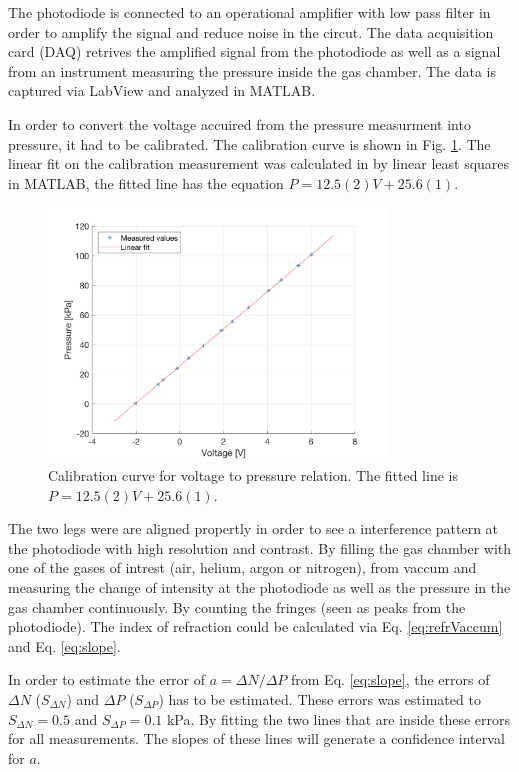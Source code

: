 The photodiode is connected to an operational amplifier with low pass filter in order to amplify the signal and reduce noise in the circut. The data acquisition card (DAQ) retrives the amplified signal from the photodiode as well as a signal from an instrument measuring the pressure inside the gas chamber. The data is captured via LabView and analyzed in MATLAB.

In order to convert the voltage accuired from the pressure measurment into pressure, it had to be calibrated. The calibration curve is shown in Fig. \ref{fig:calibration}. The linear fit on the calibration measurement was calculated in by linear least squares in MATLAB, the fitted line has the equation $P = 12.5(2)V+25.6(1)$. 


\begin{figure}[H]
  \centering
  \includegraphics[width=0.8\textwidth]{matlab/calibration.png}
  \caption{Calibration curve for voltage to pressure relation. The fitted line is $P = 12.5(2)V+25.6(1)$.}
  \label{fig:calibration}
\end{figure}

The two legs were are aligned propertly in order to see a interference pattern at the photodiode with high resolution and contrast. By filling the gas chamber with one of the gases of intrest (air, helium, argon or nitrogen), from vaccum and measuring the change of intensity at the photodiode as well as the pressure in the gas chamber continuously. By counting the fringes (seen as peaks from the photodiode). The index of refraction could be calculated via Eq. \ref{eq:refrVaccum} and Eq. \ref{eq:slope}.




In order to estimate the error of $a =\Delta N/ \Delta P$ from Eq. \ref{eq:slope}, the errors of $\Delta N$ ($S_{\Delta N}$) and $\Delta P$ ($S_{\Delta P}$) has to be estimated. These errors was estimated to $S_{\Delta N}=0.5$ and $S_{\Delta P}=0.1$ kPa. By fitting the two lines that are inside these errors for all measurements. The slopes of these lines will generate a confidence interval for $a$.
